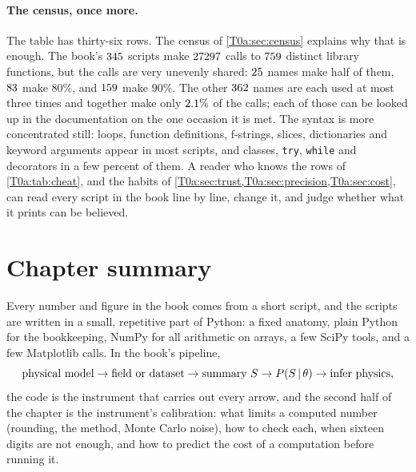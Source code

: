 \paragraph{The census, once more.} The table has thirty-six rows. The census of \cref{T0a:sec:census} explains why that is enough. The book's $345$ scripts make $27297$ calls to $759$ distinct library functions, but the calls are very unevenly shared: $25$ names make half of them, $83$ make $80\%$, and $159$ make $90\%$. The other $362$ names are each used at most three times and together make only $2.1\%$ of the calls; each of those can be looked up in the documentation on the one occasion it is met. The syntax is more concentrated still: loops, function definitions, f-strings, slices, dictionaries and keyword arguments appear in most scripts, and classes, \texttt{try}, \texttt{while} and decorators in a few percent of them. A reader who knows the rows of \cref{T0a:tab:cheat}, and the habits of \cref{T0a:sec:trust,T0a:sec:precision,T0a:sec:cost}, can read every script in the book line by line, change it, and judge whether what it prints can be believed.

\section*{Chapter summary}
\label{T0a:sec:summary}

Every number and figure in the book comes from a short script, and the scripts are written in a small, repetitive part of Python: a fixed anatomy, plain Python for the bookkeeping, NumPy for all arithmetic on arrays, a few SciPy tools, and a few Matplotlib calls. In the book's pipeline,
\[
  \text{physical model}\to\text{field or dataset}\to\text{summary }S\to P(S\,\vert\,\theta)\to\text{infer physics},
\]
the code is the instrument that carries out every arrow, and the second half of the chapter is the instrument's calibration: what limits a computed number (rounding, the method, Monte Carlo noise), how to check each, when sixteen digits are not enough, and how to predict the cost of a computation before running it.

